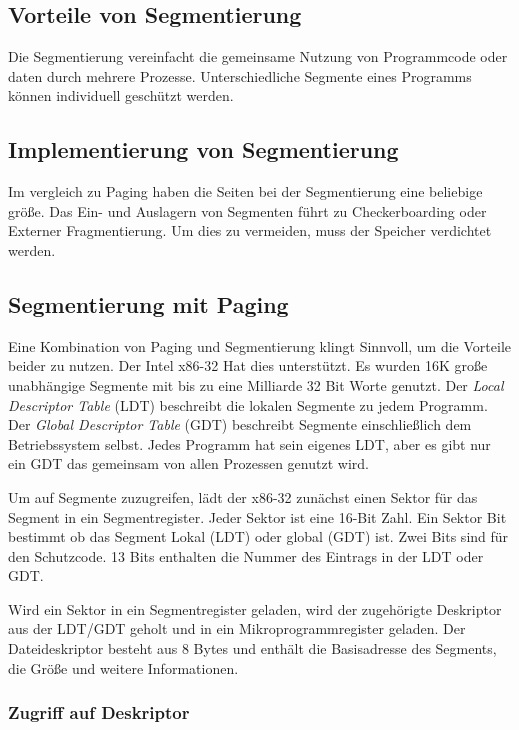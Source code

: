 \subsection{Vorteile von Segmentierung}

Die Segmentierung vereinfacht die gemeinsame Nutzung von Programmcode oder daten durch mehrere Prozesse. Unterschiedliche Segmente eines Programms können individuell geschützt werden.

\subsection{Implementierung von Segmentierung}

Im vergleich zu Paging haben die Seiten bei der Segmentierung eine beliebige größe. Das Ein- und Auslagern von Segmenten führt zu Checkerboarding oder Externer Fragmentierung. Um dies zu vermeiden, muss der Speicher verdichtet werden.

\subsection{Segmentierung mit Paging}

Eine Kombination von Paging und Segmentierung klingt Sinnvoll, um die Vorteile beider zu nutzen. Der Intel x86-32 Hat dies unterstützt. Es wurden 16K große unabhängige Segmente mit bis zu eine Milliarde 32 Bit Worte genutzt. Der \textit{Local Descriptor Table} (LDT) beschreibt die lokalen Segmente zu jedem Programm. Der \textit{Global Descriptor Table} (GDT) beschreibt Segmente einschließlich dem Betriebssystem selbst. Jedes Programm hat sein eigenes LDT, aber es gibt nur ein GDT das gemeinsam von allen Prozessen genutzt wird.

Um auf Segmente zuzugreifen, lädt der x86-32 zunächst einen Sektor für das Segment in ein Segmentregister. Jeder Sektor ist eine 16-Bit Zahl. Ein Sektor Bit bestimmt ob das Segment Lokal (LDT) oder global (GDT) ist. Zwei Bits sind für den Schutzcode. 13 Bits enthalten die Nummer des Eintrags in der LDT oder GDT.

Wird ein Sektor in ein Segmentregister geladen, wird der zugehörigte Deskriptor aus der LDT/GDT geholt und in ein Mikroprogrammregister geladen. Der Dateideskriptor besteht aus 8 Bytes und enthält die Basisadresse des Segments, die Größe und weitere Informationen.

\subsubsection{Zugriff auf Deskriptor}

